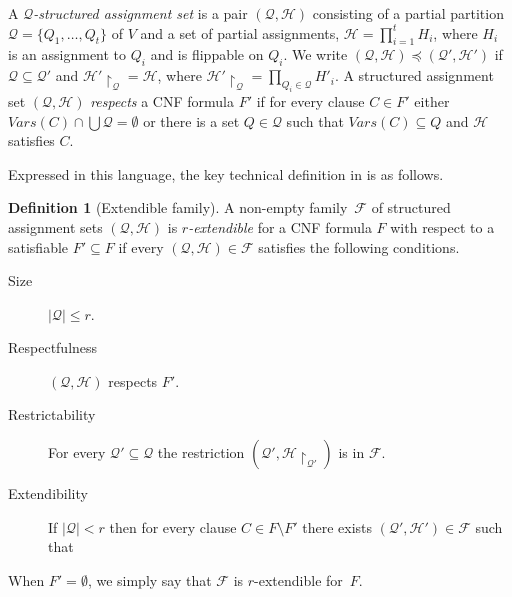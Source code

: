 \documentclass[11pt]{article}
\numberwithin{equation}{section}
\theoremstyle{definition}
\newtheorem{definition}[theorem]{Definition}
\theoremstyle{plain}
\theoremstyle{plain}
\theoremstyle{definition}
\newcommand{\set}[1]{\{ #1 \}}
\newcommand{\setsize}[1]{\lvert#1\rvert}
\newcommand{\intersection}{\cap}
\newcommand{\Union}{\bigcup}
\newcommand{\introduceterm}[1]{{\emph{#1}}}
\newcommand{\setsofvarsorlit}[2]{\mathit{#1}({#2})}
\newcommand{\vars}[1]{\setsofvarsorlit{Vars}{#1}}
\newcommand{\restrict}[2]{{{#1}\!\!\upharpoonright_{#2}}}
\newcommand{\kextendiblenot}{r}
\newcommand{\kextendible}{\mbox{$\kextendiblenot$-ex}\-tend\-ible\xspace}
\newcommand{\KextendibleNok}{Extendible\xspace}
\newcommand{\partitionnot}{\mathcal{Q}}
\newcommand{\assignmentsetnot}{\mathcal{H}}
\newcommand{\structuredassignmentsnot}[1][]{(\partitionnot #1,\assignmentsetnot #1)}
\newcommand{\kextendfamily}{\ensuremath{\mathcal{F}}\xspace}
\newcommand{\Respectfulness}{Respectfulness\xspace}
\newcommand{\Restrictionpropname}{Restrictability\xspace}
\newcommand{\Extensionpropname}{Extendibility\xspace}
\begin{document}
A \introduceterm{$\partitionnot$-structured assignment set} is a pair
$(\partitionnot, \assignmentsetnot)$ 
consisting of a partial partition $\partitionnot =
\set{Q_1, \ldots, Q_t}$ of $V$ and a set of 
partial assignments, %
$\assignmentsetnot = \prod_{i = 1}^t H_i$, where
%
%
$H_i$ is an assignment to $Q_i$ and is flippable on $Q_i$.  %
%
%
%
%
We write $(\partitionnot, \assignmentsetnot) \preccurlyeq
(\partitionnot', \assignmentsetnot')$ if $\partitionnot \subseteq \partitionnot'$
and $\restrict{\assignmentsetnot'}{\partitionnot} = \assignmentsetnot$, where
$\restrict{\assignmentsetnot'}{\partitionnot} = \prod_{Q_i \in \partitionnot} H'_i$. 
A structured assignment set $(\partitionnot, \assignmentsetnot)$
\introduceterm{respects} a CNF formula $F'$ if for every clause $C \in
F'$ either $\vars{C}\intersection \Union \partitionnot=\emptyset$ or
there is a set $Q \in \partitionnot$ such that $\vars{C}\subseteq Q$ and
$\assignmentsetnot$ satisfies $C$.

Expressed in this language, the key technical definition in 
\cite{BG15Framework}
is as follows.

\begin{definition}[\KextendibleNok family]
  \label{def:k-extendible}
  A non-empty family~$\kextendfamily$ of structured assignment sets
  $\structuredassignmentsnot$ is \introduceterm{\kextendible{}} for a CNF
  formula $F$ with respect 
  to a satisfiable $F' \subseteq F$ 
%
%
%
  if every $\structuredassignmentsnot \in \kextendfamily$
  satisfies the following conditions.
  \begin{description}
  \item[Size]%
%
    $\setsize{\partitionnot} \leq \kextendiblenot$.
  \item[\Respectfulness{}]
%
    $\structuredassignmentsnot$ respects $F'$.
  \item[\Restrictionpropname{}] 
%
    For every $\partitionnot' \subseteq \partitionnot$ the restriction
    $(\partitionnot', \restrict{\assignmentsetnot}{\partitionnot'})$ is in
    $\kextendfamily$.
  \item[\Extensionpropname{}]
%
    If $\setsize{\partitionnot} < \kextendiblenot$ then for every
    clause $C \in F\setminus F'$ there exists
    $\structuredassignmentsnot['] \in \kextendfamily$ such that 
  \end{description}
%
  When $F' = \emptyset$, we simply say that $\kextendfamily$
    is \kextendible for~$F$.
%
%
%
%
%
%
%
%
%
%
%
%
%
%
%
%
%
%
%
%
%

\end{definition}
\end{document}
